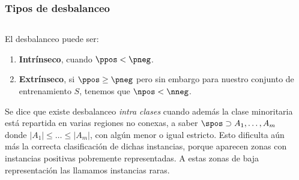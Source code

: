 \begin{frame}\frametitle{Tipos de desbalanceo}
\begin{columns} 
 \begin{column}{0.55\textwidth}
  El desbalanceo puede ser:
  
  \begin{enumerate}[i]
   \item \textbf{Intrínseco}, cuando $\ppos < \pneg$.

   \item \textbf{Extrínseco}, si $\ppos \ge \pneg$ pero sin embargo para nuestro conjunto de entrenamiento $S$, 
   tenemos que $\npos < \nneg$.
  \end{enumerate}
  
  
  Se dice que existe desbalanceo \textit{intra clases} cuando además la clase minoritaria está repartida en varias 
  regiones no conexas, a saber $\spos \supset A_1, \ldots, A_m$ donde $|A_1| \le \ldots \le |A_m|$, con algún menor o igual estricto.
  Esto dificulta aún más la correcta clasificación de dichas instancias, porque aparecen zonas con instancias positivas 
  pobremente representadas. A estas zonas de baja representación las llamamos instancias raras.
 \end{column}
 
 \begin{column}{0.45\textwidth}
 \end{column}
\end{columns}
\end{frame}

